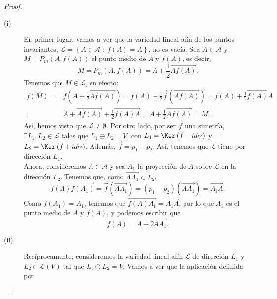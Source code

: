 \begin{proof}
\begin{description}
\item[(i)] En primer lugar, vamos a ver que la variedad lineal afín de los puntos invariantes, $\displaystyle \mathcal{L} = \left\{ A \in \mathcal{A} \; : \; f\left(A\right) = A\right\}  $, no es vacía. Sea $\displaystyle A \in \mathcal{A} $ y $\displaystyle M = P_{m}\left(A,f\left(A\right)\right) $ el punto medio de $\displaystyle A $ y $\displaystyle f\left(A\right) $, es decir, 
	\[ M = P_{m}\left(A,f\left(A\right)\right) = A + \frac{1}{2}\overrightarrow{Af\left(A\right)} .\]
Tenemos que $\displaystyle M \in \mathcal{L}$, en efecto:
\[
\begin{split}
	f\left(M\right) = & f\left(A + \frac{1}{2}\overrightarrow{Af\left(A\right)} \right) = f\left(A\right) + \frac{1}{2}\vec{f}\left(\overrightarrow{Af\left(A\right)} \right) = f\left(A\right) +\frac{1}{2}\overrightarrow{f\left(A\right)A}  \\
	= &  A + \overrightarrow{Af\left(A\right)} +\frac{1}{2}\overrightarrow{f\left(A\right)A}  = A + \frac{1}{2}\overrightarrow{Af\left(A\right)}  = M.
\end{split}
\]
Así, hemos visto que $\displaystyle \mathcal{L} \neq \emptyset $. Por otro lado, por ser $\displaystyle \vec{f} $ una simetría, $\displaystyle \exists L_{1}, L_{2} \in \mathcal{L} $ tales que $\displaystyle L_{1}\oplus L_{2} = V $, con $\displaystyle L_{1} = \Ker\left(f-id _{V}\right) $ y $\displaystyle L_{2}=\Ker\left(f+id _{V}\right) $. Además, $\displaystyle \vec{f} = p_{1}-p_{2} $. Así, tenemos que $\displaystyle \mathcal{L} $ tiene por dirección $\displaystyle L_{1} $. \\
Ahora, consideremos $\displaystyle A \in \mathcal{A} $ y sea $\displaystyle A_{1} $ la proyección de $\displaystyle A $ sobre $\displaystyle \mathcal{L} $ en la dirección $\displaystyle L_{2} $. Tenemos que, como $\displaystyle \overrightarrow{AA_{1}}\in L_{2} $,
\[\overrightarrow{f\left(A\right)f\left(A_{1}\right)} = \vec{f}\left(\overrightarrow{AA_{1}} \right) = \left(p_{1}-p_{2}\right)\left(\overrightarrow{AA_{1}}\right) = \overrightarrow{A_{1}A}  .\]
Como $\displaystyle f\left(A_{1}\right) = A_{1} $, tenemos que $\displaystyle \overrightarrow{f\left(A\right)A_{1}}=\overrightarrow{A_{1}A} $, por lo que $\displaystyle A_{1} $ es el punto medio de $\displaystyle A $ y $\displaystyle f\left(A\right) $, y podemos escribir que 
\[ f\left(A\right) = A + 2 \overrightarrow{AA_{1}} .\]
\item[(ii)] Recíprocamente, consideremos la variedad lineal afín $\displaystyle \mathcal{L} $ de dirección $\displaystyle L_{1} $ y $\displaystyle L_{2} \in \mathcal{L}\left(V\right) $ tal que $\displaystyle L_{1} \oplus L_{2} = V $. Vamos a ver que la aplicación definida por 

\end{description}
\end{proof}
